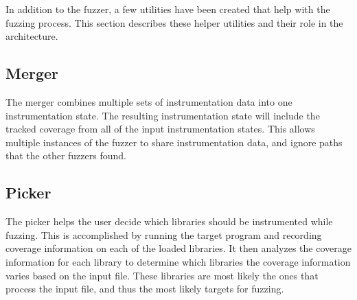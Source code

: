 In addition to the fuzzer, a few utilities have been created that help with the
fuzzing process.  This section describes these helper utilities and their role
in the \killerbeez{} architecture.

\subsection{Merger}
The merger combines multiple sets of instrumentation data into one
instrumentation state.  The resulting instrumentation state will include the
tracked coverage from all of the input instrumentation states. This allows
multiple instances of the fuzzer to share instrumentation data, and ignore paths
that the other fuzzers found.

\subsection{Picker}
The picker helps the user decide which libraries should be instrumented while
fuzzing.  This is accomplished by running the target program and recording
coverage information on each of the loaded libraries. It then analyzes the
coverage information for each library to determine which libraries the
coverage information varies based on the input file.  These libraries are most
likely the ones that process the input file, and thus the most likely targets
for fuzzing.


